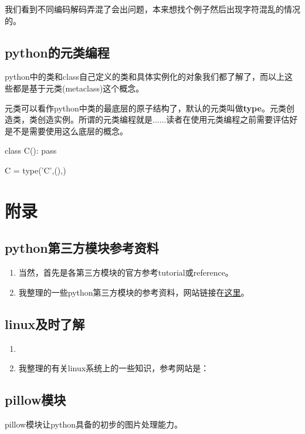 \documentclass[12pt,oneside]{book}
\begin{document}
\begin{common-format}
我们看到不同编码解码弄混了会出问题，本来想找个例子然后出现字符混乱的情况的。


\chapter{python的元类编程}
python中的类和class自己定义的类和具体实例化的对象我们都了解了，而以上这些都是基于元类(metaclass)这个概念。

元类可以看作python中类的最底层的原子结构了，默认的元类叫做\textbf{type}。元类创造类，类创造实例。所谓的元类编程就是......读者在使用元类编程之前需要评估好是不是需要使用这么底层的概念。

\begin{tcbpython}[]
class C():
    pass
\end{tcbpython}

\begin{tcbpython}[]
C = type('C',(),{})
\end{tcbpython}

\appendix
\part{附录}
\chapter{python第三方模块参考资料}
\begin{enumerate}
\item 当然，首先是各第三方模块的官方参考tutorial或reference。
\item 我整理的一些python第三方模块的参考资料，网站链接在\href{http://a358003542.github.io/articles/index.html#sec:python%E7%AC%AC%E4%B8%89%E6%96%B9%E6%A8%A1%E5%9D%97}{这里}。
\end{enumerate}


\chapter{linux及时了解}
\begin{enumerate}
\item 
\item 我整理的有关linux系统上的一些知识，参考网站是：
\end{enumerate}


\chapter{pillow模块}
pillow模块让python具备的初步的图片处理能力。


\end{common-format}
\end{document}
